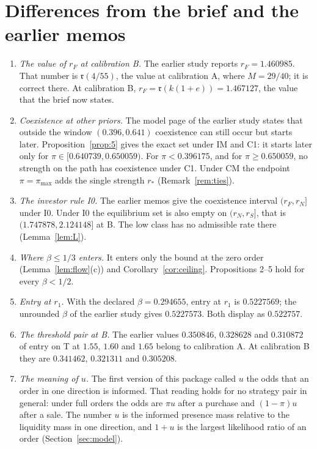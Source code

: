 \documentclass[11pt]{article}
\theoremstyle{definition}
\newcommand{\fr}{\mathfrak r}
\begin{document}
\section{Differences from the brief and the earlier memos}\label{sec:differences}

\begin{enumerate}
\item \emph{The value of $r_F$ at calibration B.} The earlier study reports $r_F=1.460985$. That number is
  $\fr(4/55)$, the value at calibration A, where $M=29/40$; it is correct there. At calibration B,
  $r_F=\fr(k(1+e))=1.467127$, the value that the brief now states.
\item \emph{Coexistence at other priors.} The model page of the earlier study states that outside the window
  $(0.396,0.641)$ coexistence can still occur but starts later. Proposition~\ref{prop:5} gives the exact set under
  IM and C1: it starts later only for $\pi\in[0.640739,0.650059)$. For $\pi<0.396175$, and for $\pi\ge0.650059$, no
  strength on the path has coexistence under C1. Under CM the endpoint $\pi=\pi_{\max}$ adds the single strength
  $r_*$ (Remark~\ref{rem:ties}).
\item \emph{The investor rule I0.} The earlier memos give the coexistence interval $(r_F,r_N]$ under I0. Under I0
  the equilibrium set is also empty on $(r_N,r_S]$, that is $(1.747878,2.124148]$ at B. The low class has no
  admissible rate there (Lemma~\ref{lem:L}).
\item \emph{Where $\beta\le1/3$ enters.} It enters only the bound at the zero order (Lemma~\ref{lem:flow}(c)) and
  Corollary~\ref{cor:ceiling}. Propositions 2--5 hold for every $\beta<1/2$.
\item \emph{Entry at $r_1$.} With the declared $\beta=0.294655$, entry at $r_1$ is $0.5227569$; the unrounded
  $\beta$ of the earlier study gives $0.5227573$. Both display as $0.522757$.
\item \emph{The threshold pair at B.} The earlier values $0.350846$, $0.328628$ and $0.310872$ of entry on T at
  $1.55$, $1.60$ and $1.65$ belong to calibration A. At calibration B they are $0.341462$, $0.321311$ and $0.305208$.
\item \emph{The meaning of $u$.} The first version of this package called $u$ the odds that an order in one
  direction is informed. That reading holds for no strategy pair in general: under full orders the odds are
  $\pi u$ after a purchase and $(1-\pi)u$ after a sale. The number $u$ is the informed presence mass relative to the
  liquidity mass in one direction, and $1+u$ is the largest likelihood ratio of an order (Section~\ref{sec:model}).
\end{enumerate}
\end{document}
